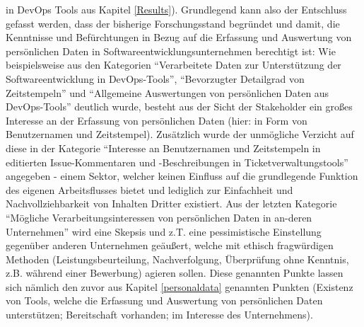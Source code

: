 in DevOps Tools aus Kapitel \ref{Results}). \newline
Grundlegend kann also der Entschluss gefasst werden, dass der bisherige Forschungsstand begründet und damit, die Kenntnisse und Befürchtungen in Bezug auf die Erfassung und Auswertung von persönlichen Daten in Softwareentwicklungsunternehmen berechtigt ist: Wie beispielsweise aus den Kategorien \enquote{Verarbeitete Daten zur Unterstützung
der Softwareentwicklung in DevOps-Tools}, \enquote{Bevorzugter Detailgrad von Zeitstempeln} und \enquote{Allgemeine Auswertungen von persönlichen Daten aus DevOps-Tools} deutlich wurde, besteht aus der Sicht der Stakeholder ein großes Interesse an der Erfassung von persönlichen Daten (hier: in Form
von Benutzernamen und Zeitstempel). Zusätzlich wurde der unmögliche Verzicht auf diese in der Kategorie \enquote{Interesse an Benutzernamen und Zeitstempeln in editierten Issue-Kommentaren und -Beschreibungen in Ticketverwaltungstools} angegeben - einem Sektor, welcher keinen Einfluss auf die grundlegende Funktion des eigenen Arbeitsflusses bietet
und lediglich zur Einfachheit und Nachvollziehbarkeit von Inhalten Dritter existiert. Aus der letzten Kategorie \enquote{Mögliche Verarbeitungsinteressen von persönlichen Daten in an-deren Unternehmen} wird eine Skepsis und z.T. eine pessimistische Einstellung gegenüber anderen Unternehmen geäußert, welche mit ethisch fragwürdigen Methoden (Leistungsbeurteilung, Nachverfolgung,
Überprüfung ohne Kenntnis, z.B. während einer Bewerbung) agieren sollen. Diese genannten Punkte lassen sich nämlich den zuvor aus Kapitel \ref{personaldata} genannten Punkten (Existenz von Tools, welche die Erfassung und Auswertung von persönlichen Daten unterstützen; Bereitschaft vorhanden; im Interesse des Unternehmens).

